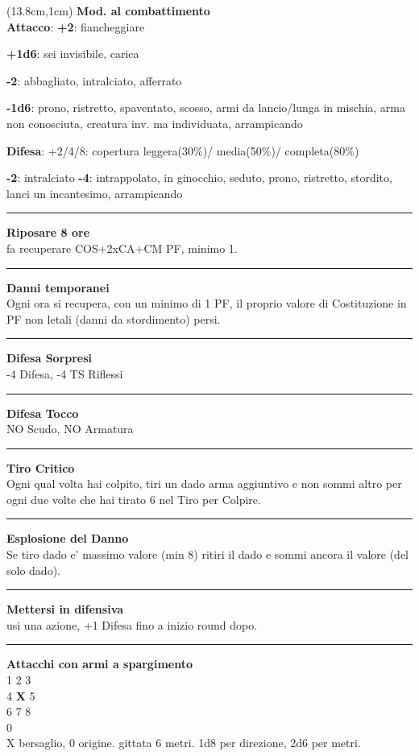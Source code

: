 \documentclass[a4paper,12 pt,openany]{book}
\newcommand{\riga}{\rule{\textwidth}{0.4pt}}
\begin{document}
\begin{textblock*}{6.2cm}(13.8cm,1cm) %
\textbf{Mod. al combattimento}\\
\textbf{Attacco}:
\textbf{+2}: fiancheggiare

\textbf{+1d6}: sei invisibile, carica

\textbf{-2}: abbagliato, intralciato, afferrato

\textbf{-1d6}: prono, ristretto, spaventato, scosso, armi da lancio/lunga in mischia, arma non conosciuta, creatura inv. ma individuata, arrampicando

\textbf{Difesa}: +2/4/8: copertura leggera(30\%)/ media(50\%)/ completa(80\%)

\textbf{-2}: intralciato \textbf{-4}: intrappolato, in ginocchio, seduto, prono, ristretto, stordito, lanci un incantesimo, arrampicando
\riga

\textbf{Riposare 8 ore} \\fa recuperare COS+2xCA+CM PF, minimo 1.

\riga

\textbf{Danni temporanei}\\ Ogni ora si recupera, con un minimo di 1 PF, il proprio valore di Costituzione in PF non letali (danni da stordimento) persi.

\riga

\textbf{Difesa Sorpresi}\\ -4 Difesa, -4 TS Riflessi

\riga

\textbf{Difesa Tocco}\\ NO Scudo, NO Armatura

\riga

\textbf{Tiro Critico}\\
Ogni qual volta hai colpito, tiri un dado arma aggiuntivo e non sommi altro per ogni due volte che hai tirato 6 nel Tiro per Colpire.

\riga

\textbf{Esplosione del Danno}\\
Se tiro dado e' massimo valore (min 8) ritiri il dado e sommi ancora il valore (del solo dado).

\riga

\textbf{Mettersi in difensiva}\\
usi una azione, +1 Difesa fino a inizio round dopo.


\riga

\textbf{Attacchi con armi a spargimento}\\
		1 2 3\\
		4 \textbf{X} 5\\
		6 7 8\\
		0\\
		X bersaglio, 0 origine. gittata 6 metri. 1d8 per direzione, 2d6 per metri.


\end{textblock*}
\end{document}

